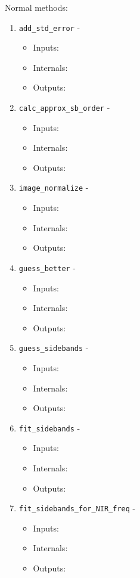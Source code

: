 \documentclass{article}
\newcommand{\code}{\texttt}
\begin{document}
\noindent Normal methods:
\begin{enumerate}
	\item \code{add\_std\_error} - 
	\begin{itemize}
		\item Inputs:
		\item Internals:
		\item Outputs:
	\end{itemize}
	
	\item \code{calc\_approx\_sb\_order} - 
	\begin{itemize}
		\item Inputs:
		\item Internals:
		\item Outputs:
	\end{itemize}
	
	\item \code{image\_normalize} - 
	\begin{itemize}
		\item Inputs:
		\item Internals:
		\item Outputs:
	\end{itemize}
	
		\item \code{guess\_better} - 
	\begin{itemize}
		\item Inputs:
		\item Internals:
		\item Outputs:
	\end{itemize}

	\item \code{guess\_sidebands} - 
	\begin{itemize}
		\item Inputs:
		\item Internals:
		\item Outputs:
	\end{itemize}

	\item \code{fit\_sidebands} - 
	\begin{itemize}
		\item Inputs:
		\item Internals:
		\item Outputs:
	\end{itemize}
		
	\item \code{fit\_sidebands\_for\_NIR\_freq} - 
	\begin{itemize}
		\item Inputs:
		\item Internals:
		\item Outputs:
	\end{itemize}


\end{enumerate}
\end{document}
